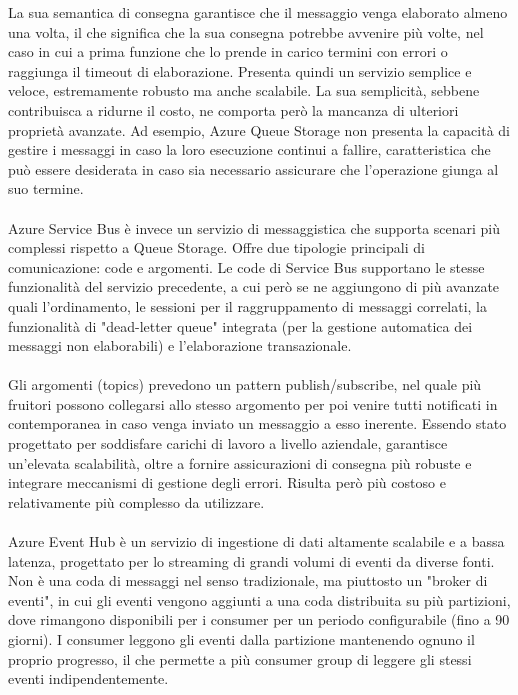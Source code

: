 La sua semantica di consegna garantisce che il messaggio venga elaborato almeno una volta,
il che significa che la sua consegna potrebbe avvenire più volte,
nel caso in cui a prima funzione che lo prende in carico
termini con errori o raggiunga il timeout di elaborazione.
Presenta quindi un servizio semplice e veloce,
estremamente robusto ma anche scalabile.
La sua semplicità, sebbene contribuisca a ridurne il costo,
ne comporta però la mancanza di ulteriori proprietà avanzate.
Ad esempio, Azure Queue Storage non presenta la capacità
di gestire i messaggi in caso la loro esecuzione continui a fallire,
caratteristica che può essere desiderata in caso sia necessario assicurare
che l'operazione giunga al suo termine.\\
\\
Azure Service Bus è invece un servizio di messaggistica
che supporta scenari più complessi rispetto a Queue Storage.
Offre due tipologie principali di comunicazione: code e argomenti.
Le code di Service Bus supportano le stesse funzionalità del servizio precedente,
a cui però se ne aggiungono di più avanzate quali l'ordinamento,
le sessioni per il raggruppamento di messaggi correlati,
la funzionalità di "dead-letter queue" integrata
(per la gestione automatica dei messaggi non elaborabili) e
l'elaborazione transazionale.\\
\\
Gli argomenti (topics) prevedono un pattern publish/subscribe,
nel quale più fruitori possono collegarsi allo stesso argomento per poi
venire tutti notificati in contemporanea in caso venga inviato un messaggio a esso inerente.
Essendo stato progettato per soddisfare carichi di lavoro a livello aziendale,
garantisce un'elevata scalabilità,
oltre a fornire assicurazioni di consegna più robuste e
integrare meccanismi di gestione degli errori.
Risulta però più costoso e relativamente più complesso da utilizzare.\\
\\
Azure Event Hub è un servizio di ingestione di dati altamente scalabile e a bassa latenza,
progettato per lo streaming di grandi volumi di eventi da diverse fonti.
Non è una coda di messaggi nel senso tradizionale,
ma piuttosto un "broker di eventi",
in cui gli eventi vengono aggiunti a una coda distribuita su più partizioni,
dove rimangono disponibili per i consumer per un periodo configurabile (fino a 90 giorni).
I consumer leggono gli eventi dalla partizione mantenendo ognuno il proprio progresso,
il che permette a più consumer group di leggere gli stessi eventi indipendentemente.

